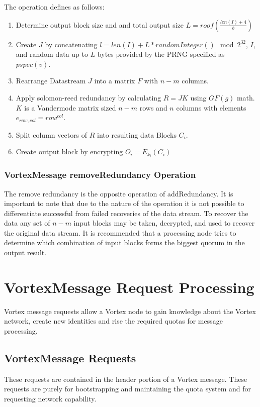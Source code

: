 The operation defines as follows:
\begin{enumerate}
	\item Determine output block size and and total output size $L=roof\left(\frac{len\left(I\right)+4}{b}\right)$
	\item Create $J$ by concatenating $l=len(I)+L*randomInteger() \mod 2^{32}$, $I$, and random data up to $L$ bytes provided by the PRNG specified as $pspec(v)$.
	\item Rearrange Datastream $J$ into a matrix $F$ with $n-m$ columns.
	\item Apply solomon-reed redundancy by calculating $R=JK$ using $GF(g)$ math. $K$ is a Vandermode matrix sized $n-m$ rows and $n$ columns with elements $e_{row,col}=row^{col}$.
	\item Split column vectors of $R$ into resulting data Blocks $C_i$.
	\item Create output block by encrypting $O_i=E_{k_i}\left(C_i\right)$
\end{enumerate}

\subsubsection{VortexMessage removeRedundancy Operation}
The remove redundancy is the opposite operation of addRedundancy. It is important to note that due to the nature of the operation it is not possible to differentiate successful from failed recoveries of the data stream. To recover the data any set of $n-m$ input blocks may be taken, decrypted, and used to recover the original data stream. It is recommended that a processing node tries to determine which combination of input blocks forms the biggest quorum in the output result.



\section{VortexMessage Request Processing}
Vortex message requests allow a Vortex node to gain knowledge about the Vortex network, create new identities and rise the required quotas for message processing.

\subsection{VortexMessage Requests}
These requests are contained in the header portion of a Vortex message. These requests are purely for bootstrapping and maintaining the quota system and for requesting network capability.

